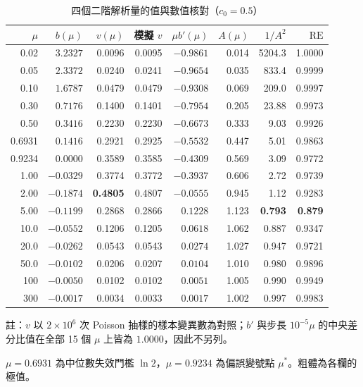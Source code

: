\documentclass[UTF8, fontset=macnew, a4paper, 12pt]{ctexart}
\begin{document}
\begin{table}[H]
\centering
\caption{四個二階解析量的值與數值核對（$c_0=0.5$）}
\small
\begin{tabular}{rrrrrrrr}
\toprule
$\mu$ & $b(\mu)$ & $v(\mu)$ & 模擬 $v$ & $\mu b'(\mu)$ & $A(\mu)$ & $1/A^2$ & $\mathrm{RE}$\\
\midrule
0.02   & $3.2327$  & 0.0096 & 0.0095 & $-0.9861$ & 0.014 & 5204.3 & 1.0000\\
0.05   & $2.3372$  & 0.0240 & 0.0241 & $-0.9654$ & 0.035 & 833.4  & 0.9999\\
0.10   & $1.6787$  & 0.0479 & 0.0479 & $-0.9308$ & 0.069 & 209.0  & 0.9997\\
0.30   & $0.7176$  & 0.1400 & 0.1401 & $-0.7954$ & 0.205 & 23.88  & 0.9973\\
0.50   & $0.3416$  & 0.2230 & 0.2230 & $-0.6673$ & 0.333 & 9.03   & 0.9926\\
0.6931 & $0.1416$  & 0.2921 & 0.2925 & $-0.5532$ & 0.447 & 5.01   & 0.9863\\
0.9234 & $0.0000$  & 0.3589 & 0.3585 & $-0.4309$ & 0.569 & 3.09   & 0.9772\\
1.00   & $-0.0329$ & 0.3774 & 0.3772 & $-0.3937$ & 0.606 & 2.72   & 0.9739\\
2.00   & $-0.1874$ & \textbf{0.4805} & 0.4807 & $-0.0555$ & 0.945 & 1.12 & 0.9283\\
5.00   & $-0.1199$ & 0.2868 & 0.2866 & $0.1228$ & 1.123 & \textbf{0.793} & \textbf{0.879}\\
10.0   & $-0.0552$ & 0.1206 & 0.1205 & $0.0618$ & 1.062 & 0.887 & 0.9347\\
20.0   & $-0.0262$ & 0.0543 & 0.0543 & $0.0274$ & 1.027 & 0.947 & 0.9721\\
50.0   & $-0.0102$ & 0.0206 & 0.0207 & $0.0104$ & 1.010 & 0.980 & 0.9896\\
100    & $-0.0050$ & 0.0102 & 0.0102 & $0.0051$ & 1.005 & 0.990 & 0.9949\\
300    & $-0.0017$ & 0.0034 & 0.0033 & $0.0017$ & 1.002 & 0.997 & 0.9983\\
\bottomrule
\end{tabular}

{\footnotesize 註：$v$ 以 $2\times10^{6}$ 次 Poisson 抽樣的樣本變異數為對照；$b'$ 與步長 $10^{-5}\mu$ 的中央差分比值在全部 15 個 $\mu$ 上皆為 $1.0000$，因此不另列。}


\vspace{3pt}
{\footnotesize $\mu=0.6931$ 為中位數失效門檻 $\ln2$，$\mu=0.9234$ 為偏誤變號點
$\mu^{\ast}$。粗體為各欄的極值。}
\label{tab:v1}
\end{table}
\end{document}
